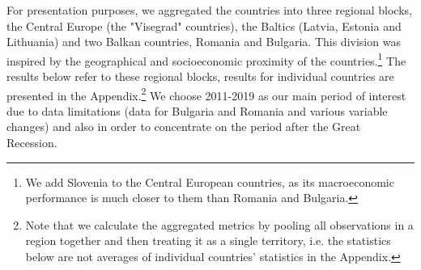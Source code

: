 \documentclass[11pt]{article}
\begin{document}
For presentation purposes, we aggregated the countries into three regional blocks, the Central Europe (the "Visegrad" countries), the Baltics (Latvia, Estonia and Lithuania) and two Balkan countries, Romania and Bulgaria. This division was inspired by the geographical and socioeconomic proximity of the countries.\footnote{We add Slovenia to the Central European countries, as its macroeconomic performance is much closer to them than Romania and Bulgaria.} The results below refer to these regional blocks, results for individual countries are presented in the Appendix.\footnote{Note that we calculate the aggregated metrics by pooling all observations in a region together and then treating it as a single territory, i.e. the statistics below are not averages of individual countries' statistics in the Appendix.} We choose 2011-2019 as our main period of interest due to data limitations (data for Bulgaria and Romania and various variable changes) and also in order to concentrate on the period after the Great Recession.
\end{document}
